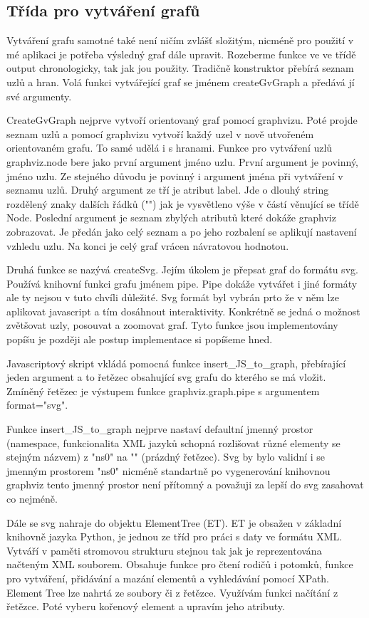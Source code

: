\documentclass[color,table,oneside,nolot,nolof]{fithesis}
\begin{document}
\subsection{Třída pro vytváření grafů}
	Vytváření grafu samotné také není ničím zvlášť složitým, nicméně pro použití v mé aplikaci je potřeba výsledný graf dále upravit. Rozeberme funkce ve ve třídě output chronologicky,
	tak jak jou použity. Tradičně konstruktor přebírá seznam uzlů a hran. Volá funkci vytvářející graf se jménem createGvGraph a předává jí své argumenty. 

	CreateGvGraph nejprve vytvoří orientovaný graf pomocí graphvizu. Poté projde seznam uzlů a pomocí graphvizu vytvoří každý uzel v nově utvořeném orientovaném grafu. To samé udělá i
	s hranami. Funkce pro vytváření uzlů graphviz.node bere jako první argument jméno uzlu. První argument je povinný, jméno uzlu. Ze stejného důvodu je povinný i argument jména
	při vytváření v seznamu uzlů. Druhý argument ze tří je atribut label. Jde o dlouhý string rozdělený znaky dalších řádků ("\n") jak je vysvětleno výše v částí věnující se třídě Node.
	Poslední argument je seznam zbylých atributů které dokáže graphviz zobrazovat. Je předán jako celý seznam a po jeho rozbalení se aplikují nastavení vzhledu uzlu. Na konci je celý
	graf vrácen návratovou hodnotou.

	Druhá funkce se nazývá createSvg. Jejím úkolem je přepsat graf do formátu svg. Používá knihovní funkci grafu jménem pipe. Pipe dokáže vytvářet i jiné formáty ale ty nejsou v tuto
	chvíli důležité. Svg formát byl vybrán prto že v něm lze aplikovat javascript a tím dosáhnout interaktivity. Konkrétně se jedná o možnost zvětšovat uzly, posouvat a zoomovat graf.
	Tyto funkce jsou implementovány popíšu je později ale postup implementace si popíšeme hned.

	Javascriptový skript vkládá pomocná funkce insert_JS_to_graph, přebírající jeden argument a to řetězec obsahující svg grafu do kterého se má vložit. Zmíněný řetězec je výstupem funkce
	graphviz.graph.pipe s argumentem format="svg". 

	Funkce insert_JS_to_graph nejprve nastaví defaultní jmenný prostor (namespace, funkcionalita XML jazyků schopná rozlišovat různé elementy se stejným názvem) z "ns0" na "" (prázdný 
	řetězec). Svg by bylo validní i se jmenným prostorem "ns0" nicméně standartně po vygenerování knihovnou graphviz tento jmenný prostor není přítomný a považuji za lepší do svg 
	zasahovat co nejméně. 

	Dále se svg nahraje do objektu ElementTree (ET). ET je obsažen v základní knihovně jazyka Python, je jednou ze tříd pro práci s daty ve formátu XML. Vytváří v paměti stromovou
	strukturu stejnou tak jak je reprezentována načteným XML souborem. Obsahuje funkce pro čtení rodičů i potomků, funkce pro vytváření, přidávání a mazání elementů a vyhledávání pomocí 
	XPath. Element Tree lze nahrtá ze soubory či z řetězce. Využívám funkci načítání z řetězce. Poté vyberu kořenový element a upravím jeho atributy.
\end{document}
